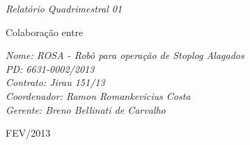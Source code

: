 






\thispagestyle{empty}

\hypersetup{pageanchor=false}



\begin{center}
 {\LARGE \textit{Relatório Quadrimestral 01}}


 \vfill


  {\LARGE Colaboração entre}
  \vspace{0.25cm}

  \vfill


 { \textit{Nome: ROSA - Robô para operação de Stoplog Alagados}}\\
{ \textit{PD: 6631-0002/2013 }}\\
{ \textit{Contrato: Jirau 151/13}}\\
{ \textit{Coordenador: Ramon Romankevicius Costa}}\\
{ \textit{Gerente: Breno Bellinati de Carvalho}}\\
  \vspace{0.25cm}



  { FEV/2013}
\end{center}

